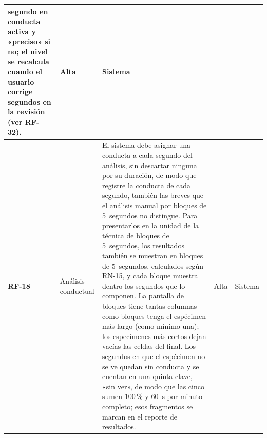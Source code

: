 \begin{longtable}{|>{\bfseries}p{1.1cm}|>{\raggedright}p{2.8cm}|>{\raggedright\arraybackslash}p{5.7cm}|p{1.3cm}|p{2.2cm}|}
        segundo en conducta activa y «preciso» si no; el nivel se recalcula cuando el
        usuario corrige segundos en la revisión (ver RF-32).
      & Alta & Sistema \\
      \hline
RF-18 & Análisis conductual
      & El sistema debe asignar una conducta a cada segundo del análisis, sin
        descartar ninguna por su duración, de modo que registre la conducta de cada
        segundo, también las breves que el análisis manual por bloques de
        5~segundos no distingue. Para presentarlos en la unidad de la técnica de bloques de
        5~segundos, los resultados también se muestran en bloques de 5~segundos,
        calculados según RN-15, y cada bloque muestra dentro los segundos que lo
        componen. La pantalla de bloques tiene tantas columnas como bloques tenga el
        espécimen más largo (como mínimo una); los especímenes más cortos dejan
        vacías las celdas del final. Los segundos en que el espécimen no se ve quedan
        sin conducta y se cuentan en una quinta clave, «sin ver», de modo que las
        cinco sumen 100\,\% y 60~s por minuto completo; esos fragmentos se marcan en el
        reporte de resultados.
      & Alta & Sistema \\
\hline


\end{longtable}
